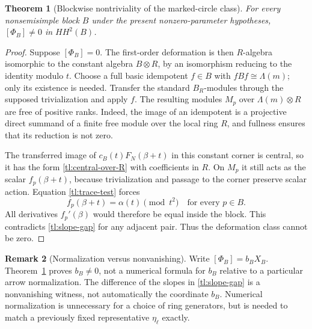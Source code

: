 \documentclass[a4paper,11pt,oneside,reqno]{amsart}
\newtheorem{theorem}{Theorem}[section]
\theoremstyle{definition}
\newtheorem{remark}[theorem]{Remark}
\numberwithin{equation}{section}
\begin{document}
	\begin{theorem}[Blockwise nontriviality of the marked-circle class]
		\label{tl:block-Phi}
		For every nonsemisimple block $B$ under the present nonzero-parameter
		hypotheses, $[\Phi_B]\ne0$ in $HH^2(B)$.
	\end{theorem}
	\begin{proof}
		Suppose $[\Phi_B]=0$.  The first-order deformation is then
		$R$-algebra isomorphic to the constant algebra $B\otimes R$, by an
		isomorphism reducing to the identity modulo $t$.
		Choose a full basic idempotent $f\in B$ with $fBf\cong\Lambda(m)$;
		only its existence is needed.  Transfer the standard $B_R$-modules
		through the supposed trivialization and apply $f$.  The resulting
		modules $M_p$ over $\Lambda(m)\otimes R$ are free of positive ranks.
		Indeed, the image of an idempotent is a projective direct summand of
		a finite free module over the local ring $R$, and fullness ensures
		that its reduction is not zero.
		
		The transferred image of $c_B(t)F_N(\beta+t)$ in this constant
		corner is central, so it has the form \eqref{tl:central-over-R}
		with coefficients in $R$.  On $M_p$ it still acts as the scalar
		$f_p(\beta+t)$, because trivialization and passage to the corner
		preserve scalar action.  Equation \eqref{tl:trace-test} forces
		\[
		f_p(\beta+t)=\alpha(t)\pmod{t^2}
		\quad\text{for every }p\in B.
		\]
		All derivatives $f_p'(\beta)$ would therefore be equal inside the
		block.  This contradicts \eqref{tl:slope-gap} for any adjacent pair.
		Thus the deformation class cannot be zero.
	\end{proof}
	
	\begin{remark}[Normalization versus nonvanishing]
		Write $[\Phi_B]=b_BX_B$.  Theorem~\ref{tl:block-Phi} proves
		$b_B\ne0$, not a numerical formula for $b_B$ relative to a
		particular arrow normalization.  The difference of the slopes in
		\eqref{tl:slope-gap} is a nonvanishing witness, not automatically
		the coordinate $b_B$.  Numerical normalization is unnecessary for a
		choice of ring generators, but is needed to match a previously fixed
		representative $\eta_\ell$ exactly.
	\end{remark}
	
\end{document}
